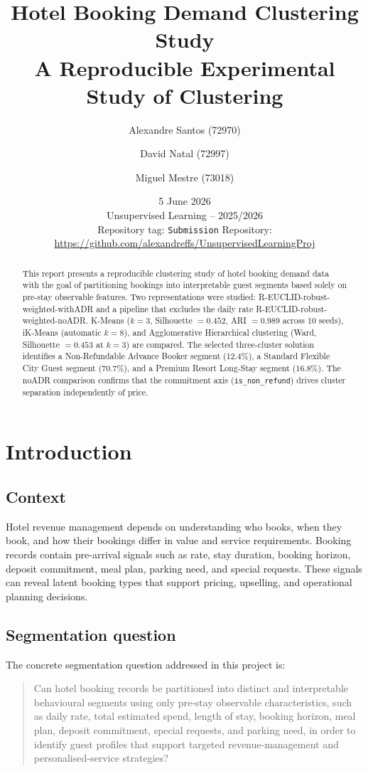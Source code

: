\documentclass[11pt,a4paper]{article}
\title{\textbf{Hotel Booking Demand Clustering Study}\\
\large A Reproducible Experimental Study of Clustering}
\author{
Alexandre Santos (72970) \and
David Natal (72997) \and
Miguel Mestre (73018)
}
\date{5 June 2026\\
\small Unsupervised Learning -- 2025/2026\\
\small Repository tag: \texttt{Submission} \quad Repository: \url{https://github.com/alexandreffs/UnsupervisedLearningProj}}
\newcommand{\withadr}{R-EUCLID-robust-weighted-withADR}
\newcommand{\noadr}{R-EUCLID-robust-weighted-noADR}
\begin{document}
\maketitle

\begin{abstract}
This report presents a reproducible clustering study of hotel booking demand data
with the goal of partitioning bookings into
interpretable guest segments based solely on pre-stay observable features. Two
representations were studied:  \withadr{} and a pipeline that excludes the daily rate \noadr{}. K-Means ($k=3$,
Silhouette $=0.452$, ARI $=0.989$ across 10 seeds), iK-Means
(automatic $k=8$), and Agglomerative Hierarchical clustering (Ward, Silhouette
$=0.453$ at $k=3$) are compared. The selected
three-cluster solution identifies a Non-Refundable Advance Booker segment
(12.4\%), a Standard Flexible City Guest segment (70.7\%), and a Premium Resort
Long-Stay segment (16.8\%). The noADR comparison confirms that the commitment
axis (\texttt{is\_non\_refund}) drives cluster separation independently of price.
\end{abstract}

\tableofcontents

\section{Introduction}

\subsection{Context}
Hotel revenue management depends on understanding who books, when they book, and how their bookings differ in value and service requirements. Booking records contain pre-arrival signals such as rate, stay duration, booking horizon, deposit commitment, meal plan, parking need, and special requests. These signals can reveal latent booking types that support pricing, upselling, and operational planning decisions.

\subsection{Segmentation question}
The concrete segmentation question addressed in this project is:

\begin{quote}
Can hotel booking records be partitioned into distinct and interpretable behavioural segments using only pre-stay observable characteristics, such as daily rate, total estimated spend, length of stay, booking horizon, meal plan, deposit commitment, special requests, and parking need, in order to identify guest profiles that support targeted revenue-management and personalised-service strategies?
\end{quote}
\end{document}
